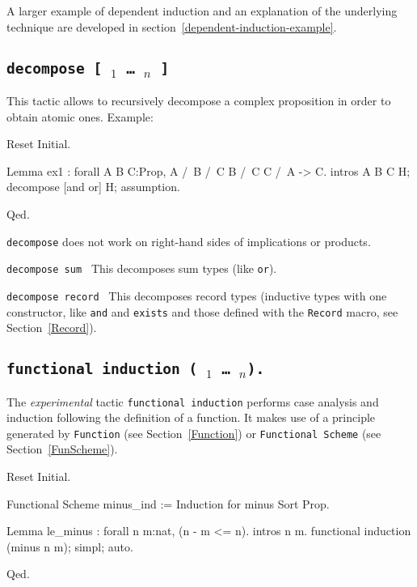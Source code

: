 A larger example of dependent induction and an explanation of the
underlying technique are developed in section~\ref{dependent-induction-example}.

\subsection{\tt decompose [ {\qualid$_1$} \dots\ {\qualid$_n$} ] \term
\label{decompose}
}

This tactic allows to recursively decompose a
complex proposition in order to obtain atomic ones.
Example: 

\begin{coq_eval}
Reset Initial.
\end{coq_eval}
\begin{coq_example}
Lemma ex1 : forall A B C:Prop, A /\ B /\ C \/ B /\ C \/ C /\ A -> C.
intros A B C H; decompose [and or] H; assumption.
\end{coq_example}
\begin{coq_example*}
Qed.
\end{coq_example*}

{\tt decompose} does not work on right-hand sides of implications or products.

\begin{Variants}
  
\item {\tt decompose sum \term}
  This decomposes sum types (like \texttt{or}).
\item {\tt decompose record \term}
  This decomposes record types (inductive types with one constructor,
  like \texttt{and} and \texttt{exists} and those defined with the
  \texttt{Record} macro, see Section~\ref{Record}).
\end{Variants}


\subsection{\tt functional induction (\qualid\ \term$_1$ \dots\ \term$_n$).
\label{FunInduction}}

The \emph{experimental} tactic \texttt{functional induction} performs
case analysis and induction following the definition of a function. It
makes use of a principle generated by \texttt{Function}
(see Section~\ref{Function}) or \texttt{Functional Scheme}
(see Section~\ref{FunScheme}).

\begin{coq_eval}
Reset Initial.
\end{coq_eval}
\begin{coq_example}
Functional Scheme minus_ind := Induction for minus Sort Prop.

Lemma le_minus : forall n m:nat, (n - m <= n).
intros n m.
functional induction (minus n m); simpl; auto.
\end{coq_example}
\begin{coq_example*}
Qed.
\end{coq_example*}

